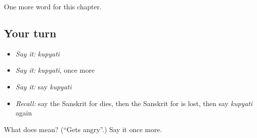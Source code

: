 \begin{grammarlens}[title={What you've built}]
One more word for this chapter.
\end{grammarlens}

\subsection*{Your turn}
\begin{itemize}
\raggedright
  \item \emph{Say it:} \emph{kupyati}
  \item \emph{Say it:} \emph{kupyati}, once more
  \item \emph{Say it:} say \emph{kupyati}
  \item \emph{Recall:} say the Sanskrit for dies, then the Sanskrit for is lost, then say \emph{kupyati} again
\end{itemize}

\begin{tcolorbox}[breakable,colback=teal!4,colframe=teal!35!black,title={Before you move on}]
What does  mean? (\textquotedblleft{}Gets angry\textquotedblright{}.) Say it once more.
\end{tcolorbox}
